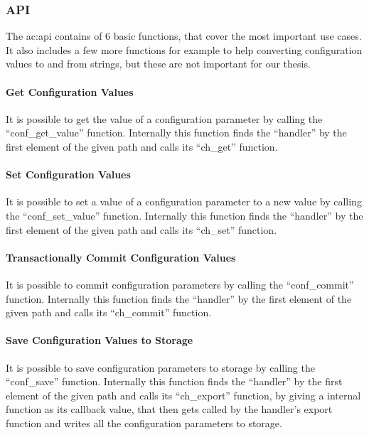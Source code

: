 \subsubsection{API}
\label{sec:related_work:mynewt_api}

The \gls{ac:api} contains of 6 basic functions, that cover the most important use cases.
It also includes a few more functions for example to help converting configuration values to and from strings, but these are not important for our thesis.

\paragraph*{Get Configuration Values}\mbox{}

It is possible to get the value of a configuration parameter by calling the ``conf\_get\_value'' function.
Internally this function finds the ``handler'' by the first element of the given path and calls its ``ch\_get'' function.

\paragraph*{Set Configuration Values}\mbox{}

It is possible to set a value of a configuration parameter to a new value by calling the ``conf\_set\_value'' function.
Internally this function finds the ``handler'' by the first element of the given path and calls its ``ch\_set'' function.

\paragraph*{Transactionally Commit Configuration Values}\mbox{}

It is possible to commit configuration parameters by calling the ``conf\_commit'' function.
Internally this function finds the ``handler'' by the first element of the given path and calls its ``ch\_commit'' function.

\paragraph*{Save Configuration Values to Storage}\mbox{}

It is possible to save configuration parameters to storage by calling the ``conf\_save'' function.
Internally this function finds the ``handler'' by the first element of the given path and calls its ``ch\_export'' function, by giving a internal function as its callback value, that then gets called by the handler's export function and writes all the configuration parameters to storage.

